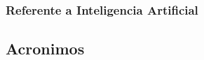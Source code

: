 \begin{enumerate}
		\newpage
		
		
	\subsubsection{Referente a Inteligencia Artificial}
		
		
		
\end{enumerate}




\newpage

\subsection{Acronimos}
\label{sec:acronimos}

\begin{description}
	

\end{description}

